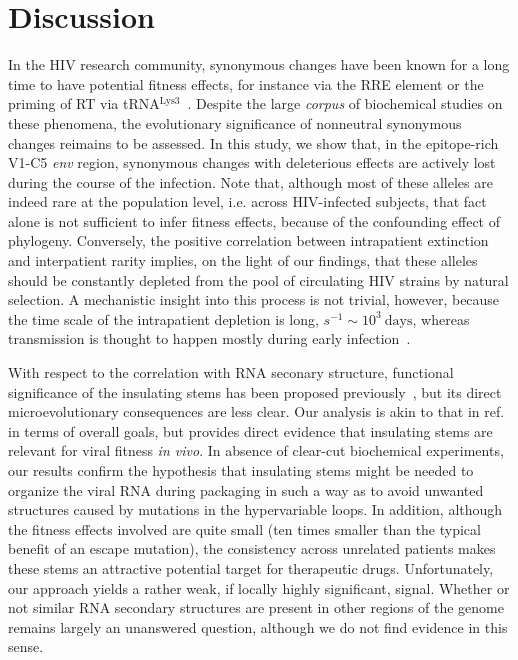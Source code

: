 \documentclass[12pt,a4paper,notitlepage,onecolumn]{article}
\newcommand{\env}{\textit{env}}
\begin{document}
\section{Discussion}
In the HIV research community, synonymous changes have been known for a long
time to have potential fitness effects, for instance via the RRE element or the
priming of RT via tRNA$^\text{Lys3}$~\citep{fernandes_hiv-1_2012,
paillart_vitro_2002}. Despite the large {\it corpus} of biochemical studies on
these phenomena, the evolutionary significance of nonneutral synonymous changes
reimains to be assessed. In this study, we show that, in the epitope-rich V1-C5
\env{} region, synonymous changes with deleterious effects are actively lost
during the course of the infection. Note that, although most of these alleles
are indeed rare at the population level, i.e. across HIV-infected subjects, that
fact alone is not sufficient to infer fitness effects, because of the
confounding effect of phylogeny. Conversely, the positive correlation between
intrapatient extinction and interpatient rarity implies, on the light of our
findings, that these alleles should be constantly depleted from the pool of
circulating HIV strains by natural selection. A mechanistic insight into this
process is not trivial, however, because the time scale of the intrapatient
depletion is long, $s^{-1} \sim 10^3~\text{days}$, whereas transmission is
thought to happen mostly during early infection~\citep{brenner_high_2007}.

With respect to the correlation with RNA seconary structure, functional
significance of the insulating stems has been proposed
previously~\citep{watts_architecture_2009, sanjuan_interplay_2011}, but its
direct microevolutionary consequences are less clear. Our analysis is akin to
that in ref.~\citep{sanjuan_interplay_2011} in terms of overall goals, but
provides direct evidence that insulating stems are relevant for viral fitness
{\it in vivo}. In absence of clear-cut biochemical experiments, our results
confirm the hypothesis that insulating stems might be needed to organize the
viral RNA during packaging in such a way as to avoid unwanted structures caused
by mutations in the hypervariable loops. In addition, although the fitness
effects involved are quite small (ten times smaller than the typical benefit of
an escape mutation), the consistency across unrelated patients makes these stems
an attractive potential target for therapeutic drugs. Unfortunately, our
approach yields a rather weak, if locally highly significant, signal. Whether or
not similar RNA secondary structures are present in other regions of the genome
remains largely an unanswered question, although we do not find evidence in this
sense. 
\end{document}
